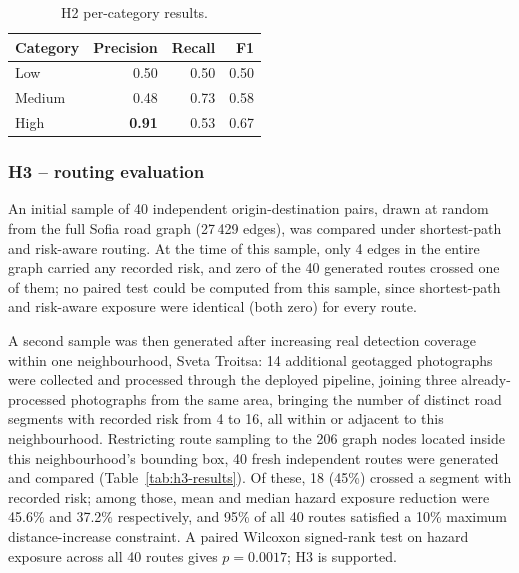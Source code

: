 \documentclass[10pt,a4paper,twocolumn]{article}
\begin{document}
\begin{table}[t]
  \centering
  \small
  \caption{H2 per-category results.}
  \label{tab:h2-per-category}
  \begin{tabular}{lrrr}
    \toprule
    Category & Precision & Recall & F1 \\
    \midrule
    Low    & 0.50 & 0.50 & 0.50 \\
    Medium & 0.48 & 0.73 & 0.58 \\
    High   & \textbf{0.91} & 0.53 & 0.67 \\
    \bottomrule
  \end{tabular}
\end{table}

\subsubsection{H3 -- routing evaluation}
\label{sec:res-h3}

An initial sample of 40 independent origin-destination pairs, drawn at
random from the full Sofia road graph (27\,429 edges), was compared under
shortest-path and risk-aware routing. At the time of this sample, only 4
edges in the entire graph carried any recorded risk, and zero of the 40
generated routes crossed one of them; no paired test could be computed
from this sample, since shortest-path and risk-aware exposure were
identical (both zero) for every route.

A second sample was then generated after increasing real detection
coverage within one neighbourhood, Sveta Troitsa: 14 additional
geotagged photographs were collected and processed through the deployed
pipeline, joining three already-processed photographs from the same
area, bringing the number of distinct road segments with recorded risk
from 4 to 16, all within or adjacent to this neighbourhood. Restricting
route sampling to the 206 graph nodes located inside this neighbourhood's
bounding box, 40 fresh independent routes were generated and compared
(Table~\ref{tab:h3-results}). Of these, 18 (45\%) crossed a segment with
recorded risk; among those, mean and median hazard exposure reduction
were 45.6\% and 37.2\% respectively, and 95\% of all 40 routes satisfied
a 10\% maximum distance-increase constraint. A paired Wilcoxon
signed-rank test on hazard exposure across all 40 routes gives
$p = 0.0017$; H3 is supported.
\end{document}
